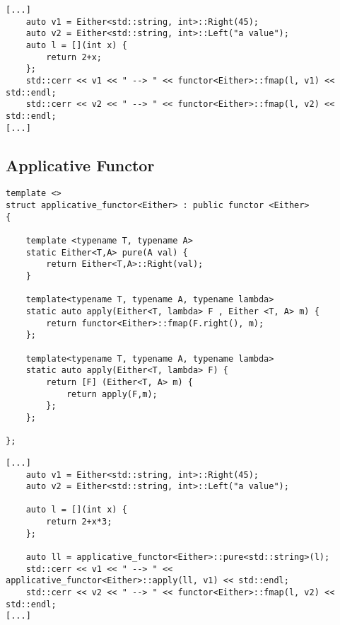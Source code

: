 \documentclass[12pt,fleqn]{article}
\begin{document}
%
%
\begin{minipage}{\linewidth}
\begin{lstlisting}[caption=Example of the Either functor,lbel=eitherfunctorexamp]
[...]
	auto v1 = Either<std::string, int>::Right(45);
	auto v2 = Either<std::string, int>::Left("a value");
	auto l = [](int x) {
		return 2+x;
	};
	std::cerr << v1 << " --> " << functor<Either>::fmap(l, v1) << std::endl;
	std::cerr << v2 << " --> " << functor<Either>::fmap(l, v2) << std::endl;
[...]
\end{lstlisting}
\end{minipage}
%
%
%


\subsection{Applicative Functor}
%


%
%
\begin{minipage}{\linewidth}
\begin{lstlisting}[caption=Either applicative functor,label=eitherapp]
template <> 
struct applicative_functor<Either> : public functor <Either>
{

	template <typename T, typename A> 
	static Either<T,A> pure(A val) {
		return Either<T,A>::Right(val);
	}

	template<typename T, typename A, typename lambda>
	static auto apply(Either<T, lambda> F , Either <T, A> m) {
		return functor<Either>::fmap(F.right(), m);
	};

	template<typename T, typename A, typename lambda>
	static auto apply(Either<T, lambda> F) {
		return [F] (Either<T, A> m) {
			return apply(F,m);
		};
	};

};
\end{lstlisting}
\end{minipage}
%
%
%


%
%
\begin{minipage}{\linewidth}
\begin{lstlisting}[caption=Either applicative, label=eitherapp]
[...]
	auto v1 = Either<std::string, int>::Right(45);
	auto v2 = Either<std::string, int>::Left("a value");

	auto l = [](int x) {
		return 2+x*3;
	};

	auto ll = applicative_functor<Either>::pure<std::string>(l);
	std::cerr << v1 << " --> " << applicative_functor<Either>::apply(ll, v1) << std::endl;
	std::cerr << v2 << " --> " << functor<Either>::fmap(l, v2) << std::endl;
[...]
\end{lstlisting}
\end{minipage}
%
%
%
\end{document}
